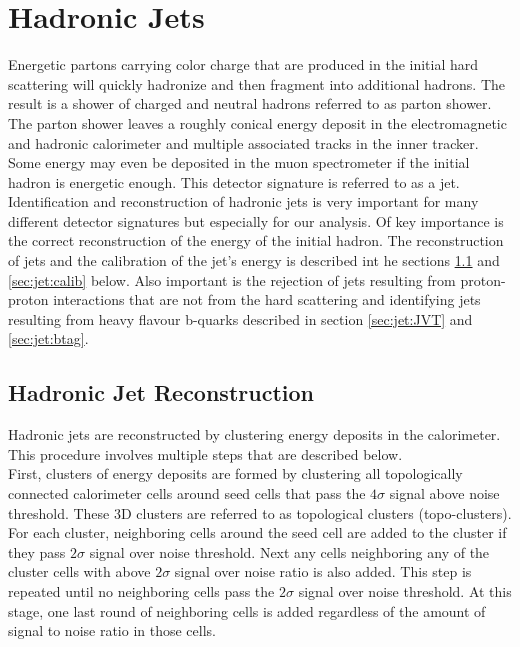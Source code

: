 \section{Hadronic Jets}
\label{sec:reco:jets}

\indent Energetic partons carrying color charge that are produced in the initial hard scattering will quickly hadronize and then fragment into additional hadrons.  The result is a shower of charged and neutral hadrons referred to as parton shower.  The parton shower leaves a roughly conical energy deposit in the electromagnetic and hadronic calorimeter and multiple associated tracks in the inner tracker.  Some energy may even be deposited in the muon spectrometer if the initial hadron is energetic enough.  This detector signature is referred to as a jet. \\

\indent Identification and reconstruction of hadronic jets is very important for many different detector signatures but especially for our analysis.  Of key importance is the correct reconstruction of the energy of the initial hadron.  The reconstruction of jets and the calibration of the jet's energy is described int he sections \ref{sec:jet:reco} and \ref{sec:jet:calib} below.  Also important is the rejection of jets resulting from proton-proton interactions that are not from the hard scattering and identifying jets resulting from heavy flavour b-quarks described in section \ref{sec:jet:JVT} and \ref{sec:jet:btag}.

\subsection{Hadronic Jet Reconstruction}
\label{sec:jet:reco}

\indent Hadronic jets are reconstructed by clustering energy deposits in the calorimeter.  This procedure involves multiple steps that are described below. \\
\indent First, clusters of energy deposits are formed by clustering all topologically connected calorimeter cells around seed cells that pass the $4\sigma$ signal above noise threshold.  These 3D clusters are referred to as topological clusters (topo-clusters).\cite{jetReco7TeV,jetReco13TeV}  For each cluster, neighboring cells around the seed cell are added to the cluster if they pass $2\sigma$ signal over noise threshold.  Next any cells neighboring any of the cluster cells with above $2\sigma$ signal over noise ratio is also added.  This step is repeated until no neighboring cells pass the $2\sigma$ signal over noise threshold.  At this stage, one last round of neighboring cells is added regardless of the amount of signal to noise ratio in those cells. \\

